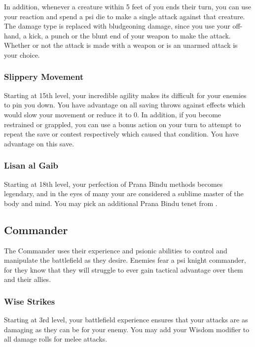 In addition,
whenever a creature within 5 feet of you ends their turn,
you can use your reaction and spend a psi die
to make a single attack against that creature.
The damage type is replaced with bludgeoning damage,
since you use your off-hand,
a kick, a punch or the blunt end of your weapon
to make the attack.
Whether or not the attack is made with a weapon
or is an unarmed attack is your choice.

\subsubsection{Slippery Movement}
Starting at 15th level,
your incredible agility makes its difficult for your
enemies to pin you down.
You have advantage on all saving throws against effects
which would slow your movement or reduce it to 0.
In addition,
if you become restrained or grappled,
you can use a bonus action on your turn
to attempt to repeat the save
or contest respectively which caused that condition.
You have advantage on this save.

\subsubsection{Lisan al Gaib}
Starting at 18th level,
your perfection of Prana Bindu methods becomes legendary,
and in the eyes of many your are considered a
sublime master of the body and mind.
You may pick an additional Prana Bindu tenet from
.

\subsection{Commander}
The Commander uses their experience and psionic abilities
to control and manipulate the battlefield as they desire.
Enemies fear a psi knight commander,
for they know that they will struggle to ever
gain tactical advantage over them and their allies.

\subsubsection{Wise Strikes}
Starting at 3rd level,
your battlefield experience ensures that your attacks
are as damaging as they can be for your enemy.
You may add your Wisdom modifier to all damage
rolls for melee attacks. 


